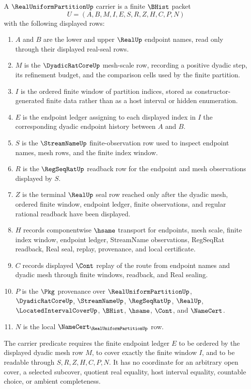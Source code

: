 \begin{definition}
\label{def:real-uniform-partition-carrier}
A $\RealUniformPartitionUp$ carrier is a finite $\BHist$ packet
$$
U=(A,B,M,I,E,S,R,Z,H,C,P,N)
$$
with the following displayed rows:
\begin{enumerate}
\item $A$ and $B$ are the lower and upper $\RealUp$ endpoint names, read only through their displayed real-seal rows.
\item $M$ is the $\DyadicRatCoreUp$ mesh-scale row, recording a positive dyadic step, its refinement budget, and the comparison cells used by the finite partition.
\item $I$ is the ordered finite window of partition indices, stored as constructor-generated finite data rather than as a host interval or hidden enumeration.
\item $E$ is the endpoint ledger assigning to each displayed index in $I$ the corresponding dyadic endpoint history between $A$ and $B$.
\item $S$ is the $\StreamNameUp$ finite-observation row used to inspect endpoint names, mesh rows, and the finite index window.
\item $R$ is the $\RegSeqRatUp$ readback row for the endpoint and mesh observations displayed by $S$.
\item $Z$ is the terminal $\RealUp$ seal row reached only after the dyadic mesh, ordered finite window, endpoint ledger, finite observations, and regular rational readback have been displayed.
\item $H$ records componentwise $\hsame$ transport for endpoints, mesh scale, finite index window, endpoint ledger, StreamName observations, RegSeqRat readback, Real seal, replay, provenance, and local certificate.
\item $C$ records displayed $\Cont$ replay of the route from endpoint names and dyadic mesh through finite windows, readback, and Real sealing.
\item $P$ is the $\Pkg$ provenance over $\RealUniformPartitionUp$, $\DyadicRatCoreUp$, $\StreamNameUp$, $\RegSeqRatUp$, $\RealUp$, $\LocatedIntervalCoverUp$, $\BHist$, $\hsame$, $\Cont$, and $\NameCert$.
\item $N$ is the local $\NameCert_{\RealUniformPartitionUp}$ row.
\end{enumerate}
The carrier predicate requires the finite endpoint ledger $E$ to be ordered by the displayed dyadic mesh row $M$, to cover exactly the finite window $I$, and to be readable through $S,R,Z,H,C,P,N$. It has no coordinate for an arbitrary open cover, a selected subcover, quotient real equality, host interval equality, countable choice, or ambient completeness.
\end{definition}

